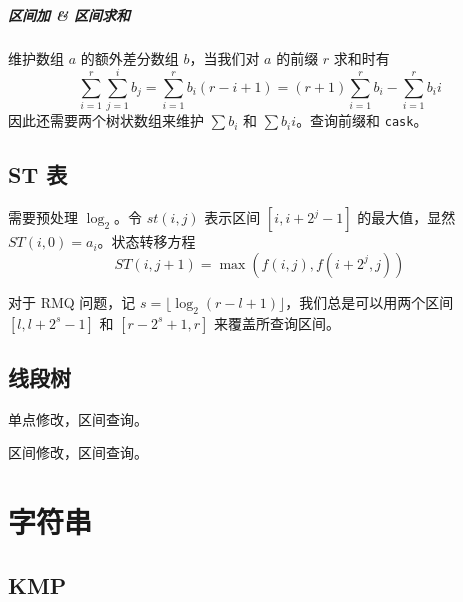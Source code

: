\documentclass{probook}
\begin{document}
\begin{multicols}{2}


\paragraph{区间加 \& 区间求和}

维护数组 $a$ 的额外差分数组 $b$，当我们对 $a$ 的前缀 $r$ 求和时有
$$\sum_{i=1}^r \sum_{j=1}^i b_j = \sum_{i=1}^rb_i(r-i+1) = (r+1)\sum_{i=1}^rb_i - \sum_{i=1}^rb_ii$$
因此还需要两个树状数组来维护 $\sum b_i$ 和 $\sum b_ii$。查询前缀和 \verb|cask|。



\section{ST 表}

需要预处理 $\log_2$。令 $st(i,j)$ 表示区间 $[i,i+2^j-1]$ 的最大值，显然 $ST(i,0)=a_i$。状态转移方程
$$ST(i,j+1) = \max(f(i,j) , f(i+2^{j},j))$$



对于 RMQ 问题，记 $s = \lfloor\log_2(r-l+1)\rfloor$，我们总是可以用两个区间 $[l,l+2^s-1]$ 和 $[r-2^s+1,r]$ 来覆盖所查询区间。



\section{线段树}

单点修改，区间查询。



区间修改，区间查询。









\chapter{字符串}

\section{KMP}


\end{multicols}
\end{document}
